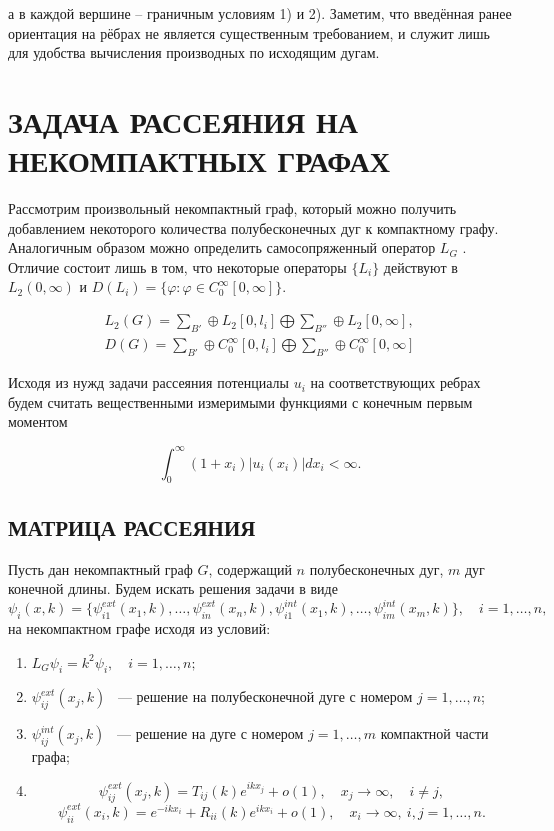 \documentclass[a4 paper, 12 pt]{extarticle}
\begin{document}
  а в каждой вершине -- граничным условиям 1) и 2). Заметим, что
  введённая ранее ориентация на рёбрах не является существенным
  требованием, и служит лишь для удобства вычисления производных по
  исходящим дугам.
  
  
  \section{ЗАДАЧА РАССЕЯНИЯ НА НЕКОМПАКТНЫХ ГРАФАХ}
  
  Рассмотрим произвольный некомпактный граф, который можно получить добавлением некоторого количества полубесконечных дуг к компактному графу.
  Аналогичным образом можно определить самосопряженный оператор
  $L_G$ \cite{GerasimenkoPavlov}. Отличие состоит лишь в том, что некоторые операторы
  $\{L_i\}$ действуют в $L_2(0, \infty)$ и
  $D(L_i)=\{\varphi:\varphi\in C_0^\infty[0,\infty]\}$.
  
  \begin{gather*}
  L_2(G)=\sum_{B'}\oplus L_2[0, l_i]\bigoplus\sum_{B''}\oplus
  L_2[0,\infty],
  \\
  D(G)=\sum_{B'}\oplus C_0^\infty[0,l_i]\bigoplus\sum_{B''}\oplus
  C_0^\infty[0,\infty]
  \end{gather*}
  
  Исходя из нужд задачи рассеяния потенциалы $u_i$ на
  соответствующих ребрах будем считать вещественными измеримыми
  функциями с конечным первым моментом
  
  \begin{equation}
  \int_0^\infty(1+x_i)|u_i(x_i)|dx_i<\infty.
  \end{equation}
  
  \subsection{МАТРИЦА РАССЕЯНИЯ}
  
  Пусть дан некомпактный граф $G$, содержащий $n$ полубесконечных дуг, $m$ дуг конечной длины.
  Будем искать решения задачи в виде
  $$\psi_i(x,k) = \{\psi_{i1}^{ext}(x_1, k), \ldots, \psi_{in}^{ext}(x_n, k), \psi_{i1}^{int}(x_1,k),\ldots,\psi_{im}^{int}(x_m,k)\}, \quad i=1,\ldots,n,$$ на некомпактном графе исходя из условий:
  \begin{enumerate}
  	\item $L_G\psi_i=k^2\psi_i,\quad i=1,\ldots,n;$
  	\item $\psi_{ij}^{ext}\left(x_j,k\right)$ ~---  решение на полубесконечной дуге с номером $j = 1,\ldots,n$; 
  	\item $\psi_{ij}^{int}\left(x_j,k\right)$ ~--- решение на дуге с номером $j = 1,\ldots,m$ компактной части графа;
  	\item $$\psi_{ij}^{ext}(x_j,k)=T_{ij}(k)e^{ikx_j}+o(1), \quad x_j\rightarrow\infty, \quad i\neq j,$$
  	$$\psi_{ii}^{ext}(x_i,k)=e^{-ikx_i} + R_{ii}(k)e^{ikx_i} + o(1), \quad x_i\rightarrow\infty, \  i,j=1,\ldots,n.$$
  \end{enumerate}
\end{document}

